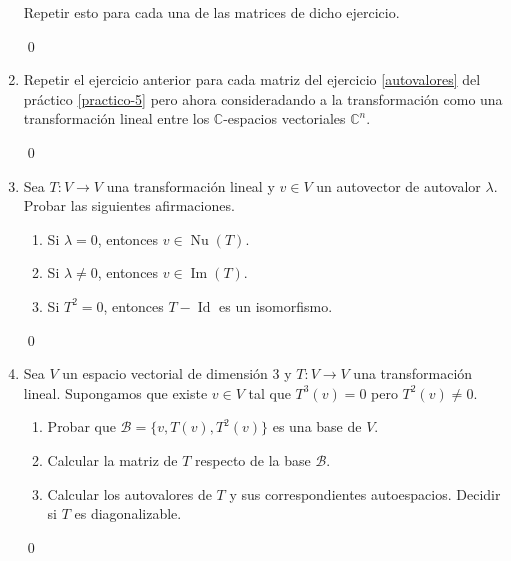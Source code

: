 \begin{enumerate}[topsep=6pt, itemsep=.4cm]
Repetir esto para cada una de las matrices de dicho ejercicio.

\rta


\qed



\item Repetir el ejercicio anterior para cada matriz del ejercicio \ref{autovalores} del práctico \ref{practico-5} pero ahora consideradando a la transformación como una transformación lineal entre los $\mathbb{C}$-espacios vectoriales $\mathbb{C}^n$.

\rta


\qed



\item Sea $T:V\longrightarrow V$ una transformación lineal y $v\in V$ un autovector de autovalor $\lambda$. Probar las siguientes afirmaciones.
\begin{enumerate}
    \item\label{autovalor-autovector-a} Si $\lambda=0$, entonces $v\in\operatorname{Nu}(T)$.
    \item\label{autovalor-autovector-b} Si $\lambda\neq0$, entonces $v\in\operatorname{Im}(T)$.
    \item\label{autovalor-autovector-c} Si $T^2=0$, entonces $T-\operatorname{Id}$ es un isomorfismo.
\end{enumerate}

\rta


\qed



\item\label{base nilp}  Sea $V$ un espacio vectorial de dimensión $3$ y $T:V\longrightarrow V$ una transformación lineal. Supongamos que existe $v\in V$ tal que $T^3(v)=0$ pero $T^2(v)\neq0$.
\begin{enumerate}
    \item\label{base nilp a}  Probar que $\mathcal{B}=\{v,T(v),T^2(v)\}$ es una base de $V$.
    \item\label{base nilp b} Calcular la matriz de $T$ respecto de la base $\mathcal{B}$.
    \item\label{base nilp c} Calcular los autovalores de $T$ y sus correspondientes autoespacios. Decidir si $T$ es diagonalizable.
\end{enumerate}

\rta


\qed




\end{enumerate}


